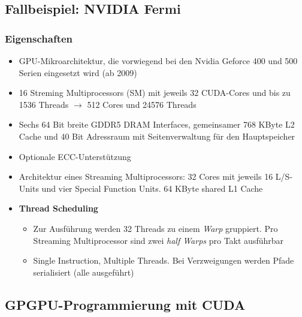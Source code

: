 \subsection{Fallbeispiel: NVIDIA Fermi}

\subsubsection{Eigenschaften}
\begin{itemize}
	\item GPU-Mikroarchitektur, die vorwiegend bei den Nvidia Geforce 400 und 500 Serien eingesetzt wird (ab 2009)
	\item 16 Streming Multiprocessors (SM) mit jeweils 32 CUDA-Cores und bis zu 1536 Threads \(\rightarrow\) 512 Cores und 24576 Threads
	\item Sechs 64 Bit breite GDDR5 DRAM Interfaces, gemeinsamer 768 KByte L2 Cache und 40 Bit Adressraum mit Seitenverwaltung für den Hauptspeicher
	\item Optionale ECC-Unterstützung
	\item Architektur eines Streaming Multiprocessors: 32 Cores mit jeweils 16 L/S-Units und vier Special Function Units. 64 KByte shared L1 Cache
	\item \textbf{Thread Scheduling}
	\begin{itemize}
		\item Zur Ausführung werden 32 Threads zu einem \textit{Warp} gruppiert. Pro Streaming Multiprocessor sind zwei \textit{half Warps} pro Takt ausführbar
		\item Single Instruction, Multiple Threads. Bei Verzweigungen werden Pfade serialisiert (alle ausgeführt)
	\end{itemize}
\end{itemize}


\subsection{GPGPU-Programmierung mit CUDA}

